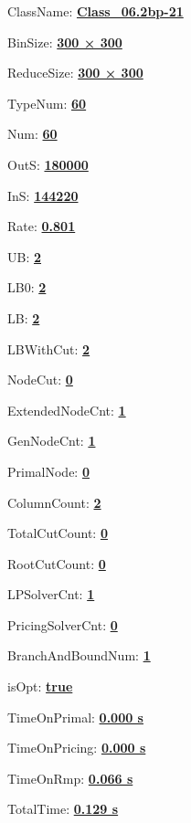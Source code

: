 \documentclass[11pt]{article}
\begin{document}
\pagestyle{empty}


ClassName: \underline{\textbf{Class_06.2bp-21}}
\par
BinSize: \underline{\textbf{300 × 300}}
\par
ReduceSize: \underline{\textbf{300 × 300}}
\par
TypeNum: \underline{\textbf{60}}
\par
Num: \underline{\textbf{60}}
\par
OutS: \underline{\textbf{180000}}
\par
InS: \underline{\textbf{144220}}
\par
Rate: \underline{\textbf{0.801}}
\par
UB: \underline{\textbf{2}}
\par
LB0: \underline{\textbf{2}}
\par
LB: \underline{\textbf{2}}
\par
LBWithCut: \underline{\textbf{2}}
\par
NodeCut: \underline{\textbf{0}}
\par
ExtendedNodeCnt: \underline{\textbf{1}}
\par
GenNodeCnt: \underline{\textbf{1}}
\par
PrimalNode: \underline{\textbf{0}}
\par
ColumnCount: \underline{\textbf{2}}
\par
TotalCutCount: \underline{\textbf{0}}
\par
RootCutCount: \underline{\textbf{0}}
\par
LPSolverCnt: \underline{\textbf{1}}
\par
PricingSolverCnt: \underline{\textbf{0}}
\par
BranchAndBoundNum: \underline{\textbf{1}}
\par
isOpt: \underline{\textbf{true}}
\par
TimeOnPrimal: \underline{\textbf{0.000 s}}
\par
TimeOnPricing: \underline{\textbf{0.000 s}}
\par
TimeOnRmp: \underline{\textbf{0.066 s}}
\par
TotalTime: \underline{\textbf{0.129 s}}
\par
\newpage
\end{document}
